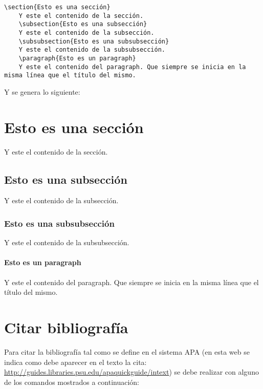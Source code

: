\begin{lstlisting}[style=Latex-color]
	\section{Esto es una sección}
	Y este el contenido de la sección.
	\subsection{Esto es una subsección}
	Y este el contenido de la subsección.
	\subsubsection{Esto es una subsubsección}
	Y este el contenido de la subsubsección.
	\paragraph{Esto es un paragraph}
 	Y este el contenido del paragraph. Que siempre se inicia en la misma línea que el título del mismo.
\end{lstlisting}
 Y se genera lo siguiente:
 \section{Esto es una sección}
	Y este el contenido de la sección.
	\subsection{Esto es una subsección}
	Y este el contenido de la subsección.
	\subsubsection{Esto es una subsubsección}
	Y este el contenido de la subsubsección.
	\paragraph{Esto es un paragraph}
 	Y este el contenido del paragraph. Que siempre se inicia en la misma línea que el título del mismo.

\section{Citar bibliografía}
Para citar la bibliografía tal como se define en el sistema APA (en esta web se indica como debe aparecer en el texto la cita: \url{http://guides.libraries.psu.edu/apaquickguide/intext}) se debe realizar con alguno de los comandos mostrados a continuación:

